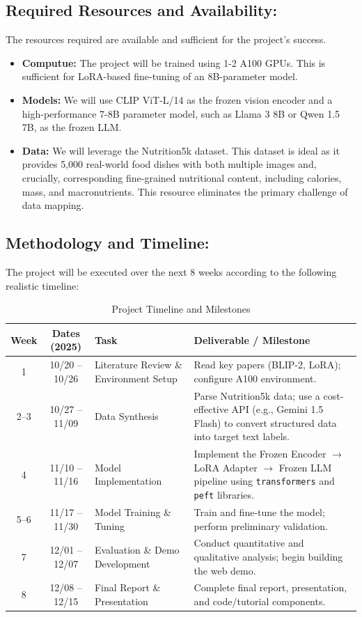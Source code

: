 \documentclass{article}
\begin{document}
\subsection{Required Resources and Availability: }
The resources required are available and sufficient for the project's success.
\begin{itemize}
    \item \textbf{Computue:} The project will be trained using 1-2 A100 GPUs. This is sufficient for LoRA-based fine-tuning of an 8B-parameter model.
    \item \textbf{Models:} We will use CLIP ViT-L/14 as the frozen vision encoder and a high-performance 7-8B parameter model, such as Llama 3 8B or Qwen 1.5 7B, as the frozen LLM.
    \item \textbf{Data:} We will leverage the Nutrition5k\cite{Nutrition5k} dataset. This dataset is ideal as it provides 5,000 real-world food dishes with both multiple images and, crucially, corresponding fine-grained nutritional content, including calories, mass, and macronutrients. This resource eliminates the primary challenge of data mapping.
\end{itemize}

\subsection{Methodology and Timeline: }
The project will be executed over the next 8 weeks according to the following realistic timeline:
\begin{table}[h!]
\centering
\caption{Project Timeline and Milestones}
\begin{tabular}{|c|c|p{4cm}|p{5cm}|}
\hline
\textbf{Week} & \textbf{Dates (2025)} & \textbf{Task} & \textbf{Deliverable / Milestone} \\ \hline
1 & 10/20 -- 10/26 & Literature Review \& Environment Setup & Read key papers (BLIP-2, LoRA); configure A100 environment. \\ \hline
2--3 & 10/27 -- 11/09 & Data Synthesis & Parse Nutrition5k data; use a cost-effective API (e.g., Gemini 1.5 Flash) to convert structured data into target text labels. \\ \hline
4 & 11/10 -- 11/16 & Model Implementation & Implement the Frozen Encoder $\rightarrow$ LoRA Adapter $\rightarrow$ Frozen LLM pipeline using \texttt{transformers} and \texttt{peft} libraries. \\ \hline
5--6 & 11/17 -- 11/30 & Model Training \& Tuning & Train and fine-tune the model; perform preliminary validation. \\ \hline
7 & 12/01 -- 12/07 & Evaluation \& Demo Development & Conduct quantitative and qualitative analysis; begin building the web demo. \\ \hline
8 & 12/08 -- 12/15 & Final Report \& Presentation & Complete final report, presentation, and code/tutorial components. \\ \hline
\end{tabular}
\end{table}
\end{document}
